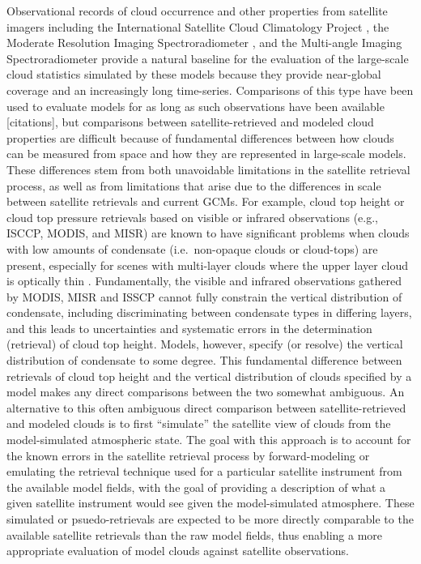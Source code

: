 Observational records of cloud occurrence and other properties from
satellite imagers including the International Satellite Cloud
Climatology Project \citep[ISCCP][]{rossow_and_schiffer_1999}, the
Moderate Resolution Imaging Spectroradiometer
\citep[MODIS][]{king_et_al_2003}, and the Multi-angle Imaging
Spectroradiometer \citep[MISR][]{diner_et_al_2002, diner_et_al_2005}
provide a natural baseline for the evaluation of the large-scale cloud
statistics simulated by these models because they provide near-global
coverage and an increasingly long time-series. Comparisons of this type
have been used to evaluate models for as long as such observations have
been available {[}citations{]}, but comparisons between
satellite-retrieved and modeled cloud properties are difficult because
of fundamental differences between how clouds can be measured from space
and how they are represented in large-scale models. These differences
stem from both unavoidable limitations in the satellite retrieval
process, as well as from limitations that arise due to the differences
in scale between satellite retrievals and current GCMs. For example,
cloud top height or cloud top pressure retrievals based on visible or
infrared observations (e.g., ISCCP, MODIS, and MISR) are known to have
significant problems when clouds with low amounts of condensate
(i.e.~non-opaque clouds or cloud-tops) are present, especially for
scenes with multi-layer clouds where the upper layer cloud is optically
thin \citep{marchand_et_al_2010, pincus_et_al_2012}. Fundamentally, the
visible and infrared observations gathered by MODIS, MISR and ISSCP
cannot fully constrain the vertical distribution of condensate,
including discriminating between condensate types in differing layers,
and this leads to uncertainties and systematic errors in the
determination (retrieval) of cloud top height. Models, however, specify
(or resolve) the vertical distribution of condensate to some degree.
This fundamental difference between retrievals of cloud top height and
the vertical distribution of clouds specified by a model makes any
direct comparisons between the two somewhat ambiguous. An alternative to
this often ambiguous direct comparison between satellite-retrieved and
modeled clouds is to first ``simulate'' the satellite view of clouds
from the model-simulated atmospheric state. The goal with this approach
is to account for the known errors in the satellite retrieval process by
forward-modeling or emulating the retrieval technique used for a
particular satellite instrument from the available model fields, with
the goal of providing a description of what a given satellite instrument
would see given the model-simulated atmosphere. These simulated or
psuedo-retrievals are expected to be more directly comparable to the
available satellite retrievals than the raw model fields, thus enabling
a more appropriate evaluation of model clouds against satellite
observations.

